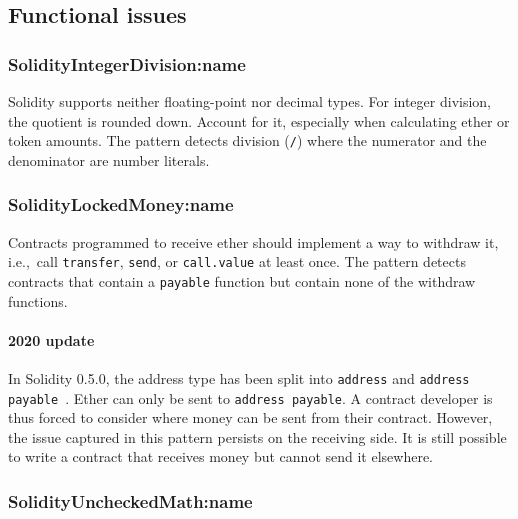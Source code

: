 \subsection{Functional issues} \label{sec:FunctionalIssues}

\subsubsection{\let\letcs\texapiletcs \usevalue SolidityIntegerDivision:name \let\letcs\etoolboxletcs} \label{SolidityIntegerDivision}

Solidity supports neither floating-point nor decimal types.
For integer division, the quotient is rounded down.
Account for it, especially when calculating ether or token amounts.
The pattern detects division (\texttt{/}) where the numerator and the denominator are number literals.

\subsubsection{\let\letcs\texapiletcs \usevalue SolidityLockedMoney:name \let\letcs\etoolboxletcs} \label{SolidityLockedMoney}

Contracts programmed to receive ether should implement a way to withdraw it, i.e.,~call \texttt{transfer}, \texttt{send}, or \texttt{call.value} at least once.
The pattern detects contracts that contain a \texttt{payable} function but contain none of the withdraw functions.

\paragraph{2020 update}
In Solidity 0.5.0, the address type has been split into \texttt{address} and \texttt{address payable}~\cite{Solidity050}.
Ether can only be sent to \texttt{address payable}.
A contract developer is thus forced to consider where money can be sent from their contract.
However, the issue captured in this pattern persists on the receiving side.
It is still possible to write a contract that receives money but cannot send it elsewhere.

\subsubsection{\let\letcs\texapiletcs \usevalue SolidityUncheckedMath:name \let\letcs\etoolboxletcs} \label{SolidityUncheckedMath}

